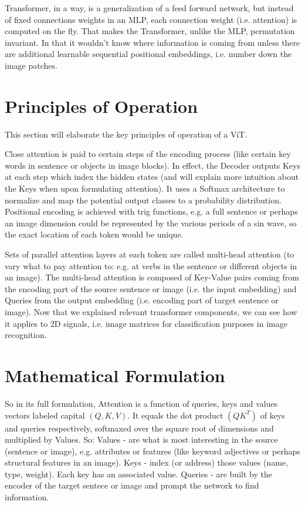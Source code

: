 Transformer, in a way, is a generalization of a feed forward network, but 
instead of fixed connections weights in an MLP, each connection weight (i.e. attention) 
is computed on the fly. That makes the Transformer, unlike the MLP, permutation invariant. 
In that it wouldn't know where information is coming from unless there are additional 
learnable sequential positional embeddings, i.e. number down the image patches.


\section{Principles of Operation}

This section will elaborate the key principles of operation of a ViT.

Close attention is paid to certain steps of 
the encoding process (like certain key words in sentence or objects in image blocks). 
In effect, the Decoder outputs Keys at each step which index the hidden states 
(and will explain more intuition about the Keys when upon formulating attention). 
It uses a Softmax architecture to normalize and map the potential output classes 
to a probability distribution. Positional encoding is achieved with trig functions, 
e.g. a full sentence or perhaps an image dimension could be represented by the various
periods of a sin wave, so the exact location of each token would be unique.

Sets of parallel attention layers at each token are called multi-head attention 
(to vary what to pay attention to: e.g. at verbs in the sentence or different objects 
in an image). The multi-head attention is composed of Key-Value pairs coming from 
the encoding part of the source sentence or image (i.e. the input embedding) and 
Queries from the output embedding (i.e. encoding part of target sentence or image).
Now that we explained relevant transformer components, we can see how it applies to 
2D signals, i.e. image matrices for classification purposes in image recognition.


\section{Mathematical Formulation}

So in its full formulation, Attention is a function of queries, keys and values 
vectors labeled capital $(Q,K,V)$. 
It equals the dot product $(QK^T)$ of keys and queries respectively, softmaxed over 
the square root of dimensions and multiplied by Values.
So:
Values - are what is most interesting in the source (sentence or image), 
e.g. attributes or features (like keyword adjectives or perhaps structural 
features in an image).
Keys - index (or address) those values (name, type, weight). Each key has an 
associated value. Queries - are built by the encoder of the target sentece or 
image and prompt the network to find information. 


